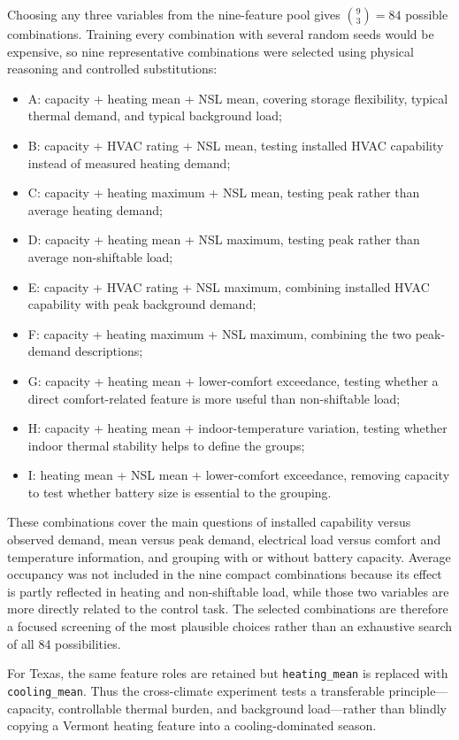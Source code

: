 Choosing any three variables from the nine-feature pool gives
$\binom{9}{3}=84$ possible combinations. Training every combination with several
random seeds would be expensive, so nine representative combinations were
selected using physical reasoning and controlled substitutions:
\begin{itemize}
  \item A: capacity + heating mean + NSL mean, covering storage flexibility,
  typical thermal demand, and typical background load;
  \item B: capacity + HVAC rating + NSL mean, testing installed HVAC capability
  instead of measured heating demand;
  \item C: capacity + heating maximum + NSL mean, testing peak rather than average
  heating demand;
  \item D: capacity + heating mean + NSL maximum, testing peak rather than average
  non-shiftable load;
  \item E: capacity + HVAC rating + NSL maximum, combining installed HVAC
  capability with peak background demand;
  \item F: capacity + heating maximum + NSL maximum, combining the two peak-demand
  descriptions;
  \item G: capacity + heating mean + lower-comfort exceedance, testing whether a
  direct comfort-related feature is more useful than non-shiftable load;
  \item H: capacity + heating mean + indoor-temperature variation, testing whether
  indoor thermal stability helps to define the groups;
  \item I: heating mean + NSL mean + lower-comfort exceedance, removing capacity to
  test whether battery size is essential to the grouping.
\end{itemize}
These combinations cover the main questions of installed capability versus
observed demand, mean versus peak demand, electrical load versus comfort and
temperature information, and grouping with or without battery capacity. Average
occupancy was not included in the nine compact combinations because its effect
is partly reflected in heating and non-shiftable load, while those two variables
are more directly related to the control task. The selected combinations are
therefore a focused screening of the most plausible choices rather than an
exhaustive search of all 84 possibilities.

For Texas, the same feature roles are retained but
\texttt{heating\_mean} is replaced with \texttt{cooling\_mean}. Thus the
cross-climate experiment tests a transferable principle---capacity, controllable
thermal burden, and background load---rather than blindly copying a Vermont
heating feature into a cooling-dominated season.


